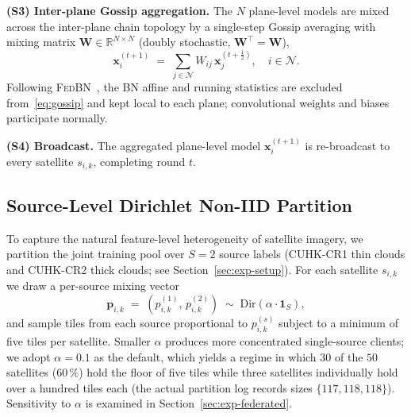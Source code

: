 \documentclass[conference]{IEEEtran}
\newcommand{\R}{\mathbb{R}}
\newcommand{\Dir}{\mathrm{Dir}}
\begin{document}
\textbf{(S3) Inter-plane Gossip aggregation.} The $N$ plane-level
models are mixed across the inter-plane chain topology by a
single-step Gossip averaging with mixing matrix
$\mathbf{W}\in\R^{N\times N}$ (doubly stochastic, $\mathbf{W}^\top\!=\!\mathbf{W}$),
\begin{equation}
\mathbf{x}^{(t+1)}_{i} \;=\;
\sum_{j\in\mathcal{N}}\!W_{ij}\,\mathbf{x}_j^{(t+\tfrac12)},
\quad i\in\mathcal{N}.
\label{eq:gossip}
\end{equation}
Following \textsc{FedBN}~\cite{ref:fedbn}, the BN affine and running
statistics are excluded from~\eqref{eq:gossip} and kept local to
each plane; convolutional weights and biases participate normally.

\textbf{(S4) Broadcast.} The aggregated plane-level model
$\mathbf{x}^{(t+1)}_i$ is re-broadcast to every satellite
$s_{i,k}$, completing round $t$.

\subsection{Source-Level Dirichlet Non-IID Partition}
\label{sec:sysmodel-partition}

To capture the natural feature-level heterogeneity of satellite
imagery, we partition the joint training pool over
$S \!=\! 2$ source labels (CUHK-CR1 thin clouds and CUHK-CR2 thick
clouds; see Section~\ref{sec:exp-setup}). For each satellite
$s_{i,k}$ we draw a per-source mixing vector
\begin{equation}
\boldsymbol{p}_{i,k} \;=\; (p_{i,k}^{(1)},\,p_{i,k}^{(2)})
\;\sim\;\Dir(\alpha\!\cdot\!\mathbf{1}_S),
\label{eq:dirichlet}
\end{equation}
and sample tiles from each source proportional to
$p_{i,k}^{(s)}$ subject to a minimum of five tiles per satellite.
Smaller $\alpha$ produces more concentrated single-source clients;
we adopt $\alpha \!=\! 0.1$ as the default, which yields a regime
in which $30$ of the $50$ satellites ($60\,\%$) hold the floor of
five tiles while three satellites individually hold over a hundred
tiles each (the actual partition log records sizes
$\{117,118,118\}$). Sensitivity to $\alpha$ is examined in
Section~\ref{sec:exp-federated}.


\end{document}
